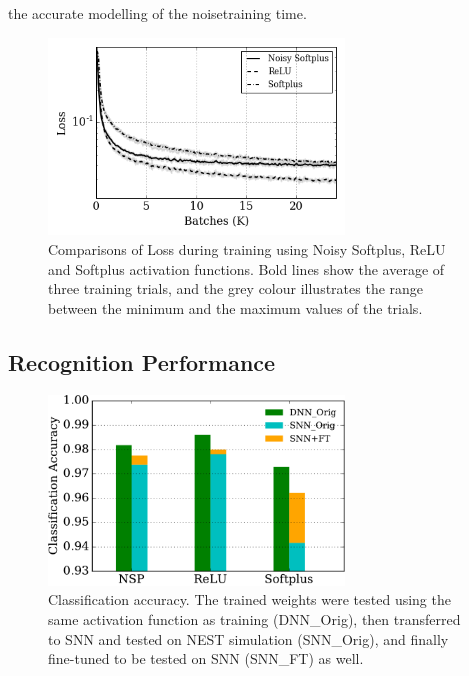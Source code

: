 	\DIFaddend the accurate modelling of the noise\DIFdelbegin {}\DIFdelend \DIFaddbegin {}\DIFaddend training time.
	\begin{figure}[tbp!]
		\centering
		\includegraphics[width=0.7\textwidth]{pics_iconip/8.png}
		\caption{Comparisons of Loss during training using Noisy Softplus, ReLU and Softplus activation functions. Bold lines show the average of three training trials, and the grey colour illustrates the range between the minimum and the maximum values of the trials.  }
		\label{Fig:loss_ns}
	\end{figure}

\subsection{Recognition Performance}
\DIFaddbegin \label{subsec:result_compare_rec}
	\DIFaddend \begin{figure}[tbp!]
		\centering
		\includegraphics[width=0.7\textwidth]{pics_iconip/9-2.pdf}
		\caption{Classification accuracy.
			The trained weights were tested using the same activation function as training (DNN\_Orig), then transferred to \DIFaddbeginFL {}\DIFaddendFL SNN and tested on NEST simulation (SNN\_Orig), and finally fine-tuned to be tested on SNN (SNN\_FT) as well.  }
		\label{Fig:result_bar}
	\end{figure}
	\DIFaddbegin 


